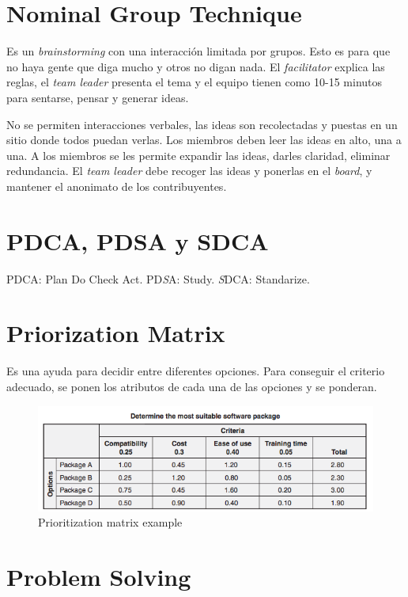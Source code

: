 \documentclass[oneside]{book}
\begin{document}
\section{Nominal Group Technique}

Es un \textit{brainstorming} con una interacción limitada por grupos. Esto es para que no haya gente que diga mucho y otros no digan nada. El \textit{facilitator} explica las reglas, el \textit{team leader} presenta el tema y el equipo tienen como 10-15 minutos para sentarse, pensar y generar ideas.

No se permiten interacciones verbales, las ideas son recolectadas y puestas en un sitio donde todos puedan verlas. Los miembros deben leer las ideas en alto, una a una. A los miembros se les permite expandir las ideas, darles claridad, eliminar redundancia. El \textit{team leader} debe recoger las ideas y ponerlas en el \textit{board}, y mantener el anonimato de los contribuyentes.

\section{PDCA, PDSA y SDCA}

PDCA: Plan Do Check Act. PD\textit{S}A: Study. \textit{S}DCA: Standarize.

\section{Priorization Matrix}

Es una ayuda para decidir entre diferentes opciones. Para conseguir el criterio adecuado, se ponen los atributos de cada una de las opciones y se ponderan.

\begin{figure}[ht!]
	\centering
	\includegraphics[width=120mm]{imagenes/Prioritizationmatrixexample.png}
	\caption{Prioritization matrix example}
	\label{fig:Prioritizationmatrixexample}
\end{figure}

\section{Problem Solving}
\end{document}
